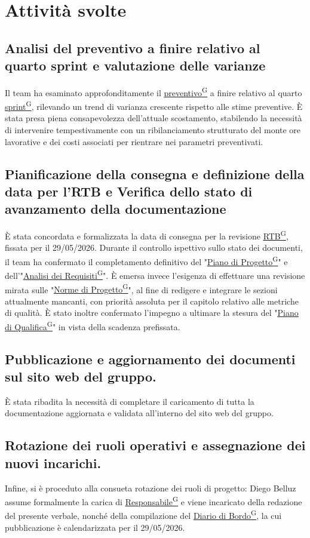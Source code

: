 \documentclass[a4paper,12pt]{article}
\providecommand{\glslink}[2]{\href{https://alittlebyte-19.github.io/Documentazione/glossario.html\#gls-#1}{\underline{#2}\textsuperscript{\scriptsize G}}}
\begin{document}
\section{Attività svolte}
\subsection{Analisi del preventivo a finire relativo al quarto sprint e valutazione delle varianze}
Il team ha esaminato approfonditamente il \glslink{preventivo}{preventivo} a finire relativo al quarto \glslink{sprint}{sprint}, rilevando un trend di varianza crescente rispetto alle stime preventive. 
È stata presa piena consapevolezza dell'attuale scostamento, stabilendo la necessità di intervenire tempestivamente con un ribilanciamento strutturato del monte ore 
lavorative e dei costi associati per rientrare nei parametri preventivati.

\subsection{Pianificazione della consegna e definizione della data per l'RTB e Verifica dello stato di avanzamento della documentazione}
È stata concordata e formalizzata la data di consegna per la revisione \glslink{rtb-requirements-and-technology-baseline}{RTB}, fissata per il 29/05/2026. Durante il controllo ispettivo sullo stato dei documenti, 
il team ha confermato il completamento definitivo del "\glslink{piano-di-progetto}{Piano di Progetto}" e dell'"\glslink{analisi-dei-requisiti-adr}{Analisi dei Requisiti}". È emersa invece l'esigenza di effettuare una revisione mirata sulle 
"\glslink{norme-di-progetto}{Norme di Progetto}", al fine di redigere e integrare le sezioni attualmente mancanti, con priorità assoluta per il capitolo relativo alle metriche di qualità. È stato inoltre 
confermato l'impegno a ultimare la stesura del "\glslink{piano-di-qualifica}{Piano di Qualifica}" in vista della scadenza prefissata.


\subsection{Pubblicazione e aggiornamento dei documenti sul sito web del gruppo.}
È stata ribadita la necessità di completare il caricamento di tutta la documentazione aggiornata e validata all'interno del sito web del gruppo.

\subsection{Rotazione dei ruoli operativi e assegnazione dei nuovi incarichi.}
Infine, si è proceduto alla consueta rotazione dei ruoli di progetto: Diego Belluz assume formalmente la carica di \glslink{responsabile}{Responsabile} e viene incaricato della redazione del presente verbale, 
nonché della compilazione del \glslink{diario-di-bordo}{Diario di Bordo}, la cui pubblicazione è calendarizzata per il 29/05/2026.
\end{document}
